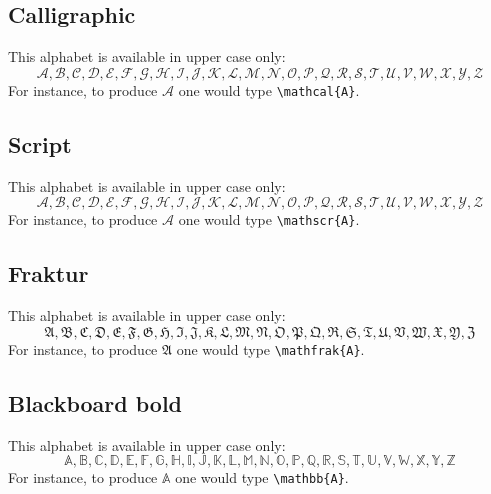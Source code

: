 \documentclass[a4paper,14pt]{extarticle}
\begin{document}
\subsection{Calligraphic}
This alphabet is available in upper case only:
\begin{equation*}
\mathcal{A, B, C, D, E, F, G, H, I, J, K, L, M, N, O, P, Q, R, S, T, U, V, W, X, Y, Z}
\end{equation*}
For instance, to produce \(\mathcal{A}\) one would type \verb=\mathcal{A}=.

\subsection{Script}
This alphabet is available in upper case only:
\begin{equation*}
\mathscr{A, B, C, D, E, F, G, H, I, J, K, L, M, N, O, P, Q, R, S, T, U, V, W, X, Y, Z}
\end{equation*}
For instance, to produce \(\mathscr{A}\) one would type \verb=\mathscr{A}=.

\subsection{Fraktur}
This alphabet is available in upper case only:
\begin{equation*}
\mathfrak{A, B, C, D, E, F, G, H, I, J, K, L, M, N, O, P, Q, R, S, T, U, V, W, X, Y, Z}
\end{equation*}
For instance, to produce \(\mathfrak{A}\) one would type \verb=\mathfrak{A}=.

\subsection{Blackboard bold}
This alphabet is available in upper case only:
\begin{equation*}
\mathbb{A, B, C, D, E, F, G, H, I, J, K, L, M, N, O, P, Q, R, S, T, U, V, W, X, Y, Z}
\end{equation*}
For instance, to produce \(\mathbb{A}\) one would type \verb=\mathbb{A}=.


\end{document}
